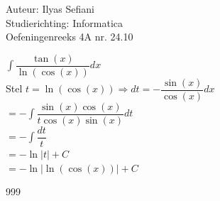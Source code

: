 \documentclass[a4paper]{article}
\begin{document}
\noindent \large Auteur: Ilyas Sefiani \\
\noindent \large Studierichting: Informatica\\
\noindent \large Oefeningenreeks 4A nr. 24.10\\

\medskip

\normalsize

$\displaystyle\int \dfrac{\tan(x)}{\ln(\cos(x))}dx$\\

Stel $t = \ln(\cos(x)) \Rightarrow dt = -\dfrac{\sin(x)}{\cos(x)}dx $\\

$=-\displaystyle\int \dfrac{\sin(x)\cos(x)}{t\cos(x)\sin(x)}dt$\\

$=-\displaystyle\int \dfrac{dt}{t}$\\

$=-\ln\lvert t \rvert+C$\\

$=-\ln\lvert\ln(\cos(x))\rvert+C$\\

\begin{thebibliography}{999}
\end{thebibliography}
\end{document}
